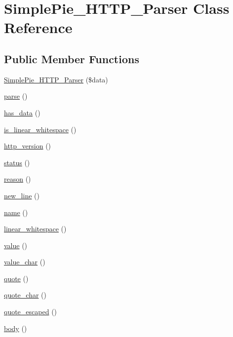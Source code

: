 \hypertarget{class_simple_pie___h_t_t_p___parser}{\section{Simple\-Pie\-\_\-\-H\-T\-T\-P\-\_\-\-Parser Class Reference}
\label{class_simple_pie___h_t_t_p___parser}
}
\subsection*{Public Member Functions}
\begin{DoxyCompactItemize}
\item 
\hyperlink{class_simple_pie___h_t_t_p___parser_a42e839824b742fa8d7a1ebddfcf137bf}{Simple\-Pie\-\_\-\-H\-T\-T\-P\-\_\-\-Parser} (\$data)
\item 
\hyperlink{class_simple_pie___h_t_t_p___parser_a173114cc13c34596a6f6ff67c37bc76d}{parse} ()
\item 
\hyperlink{class_simple_pie___h_t_t_p___parser_a625e3b5952a8a63d1908f1a5c61799d6}{has\-\_\-data} ()
\item 
\hyperlink{class_simple_pie___h_t_t_p___parser_ac326833f38badb59c57eed39b87bcb95}{is\-\_\-linear\-\_\-whitespace} ()
\item 
\hyperlink{class_simple_pie___h_t_t_p___parser_a80ac61296dbe0bd2abecae5193a3c370}{http\-\_\-version} ()
\item 
\hyperlink{class_simple_pie___h_t_t_p___parser_a566690c5eb633eb144e4e4b6dc6ed21f}{status} ()
\item 
\hyperlink{class_simple_pie___h_t_t_p___parser_a388b5a5da3d3a2769427f2c05e04afe3}{reason} ()
\item 
\hyperlink{class_simple_pie___h_t_t_p___parser_acb7cd8b070673660899e9c10473bb535}{new\-\_\-line} ()
\item 
\hyperlink{class_simple_pie___h_t_t_p___parser_abcd792abf59b8ccefb1fc4bf1d452822}{name} ()
\item 
\hyperlink{class_simple_pie___h_t_t_p___parser_ad9005adbb12c259918d5529436daef5e}{linear\-\_\-whitespace} ()
\item 
\hyperlink{class_simple_pie___h_t_t_p___parser_a0a2909572363e472fe1c9cb493831461}{value} ()
\item 
\hyperlink{class_simple_pie___h_t_t_p___parser_a9627d2c8b9addb8f84f76be367524327}{value\-\_\-char} ()
\item 
\hyperlink{class_simple_pie___h_t_t_p___parser_a7bb9710450219dd785e45d0ffefb0372}{quote} ()
\item 
\hyperlink{class_simple_pie___h_t_t_p___parser_a24ab015a974df543a2cfad298b9570f7}{quote\-\_\-char} ()
\item 
\hyperlink{class_simple_pie___h_t_t_p___parser_af107705ff83c6b519e4a3f4add25f6c5}{quote\-\_\-escaped} ()
\item 
\hyperlink{class_simple_pie___h_t_t_p___parser_ad14b9ed01f719527858b9255a860f39c}{body} ()
\end{DoxyCompactItemize}

